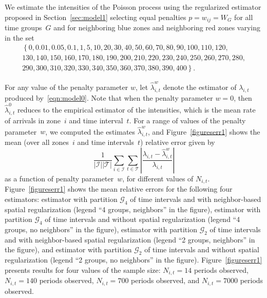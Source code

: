 \documentclass[article]{jss}
\begin{document}
{We estimate the intensities of the Poisson process using the regularized estimator proposed in Section~\ref{sec:model1} selecting equal penalties $p = w_{ij} = W_{G}$ for all time groups~$G$ and for neighboring blue zones and neighboring red zones varying in the set
$$
\begin{array}{l}
\left\{0,0.01,0.05,0.1,1,5,10,20,30,40,50,60,70,80,90,100,110,120,\right.\\
\left. 130,140,150,160,170, 180,190,200,210,220,230,240,250,260,270,280,\right.\\
\left. 290,300,310,320,330,340,350,360,370,380,390,400\right\}.
\end{array}
$$
}

For any value of the penalty parameter $w$, let $\hat{\lambda}^{w}_{i,t}$ denote the estimator of $\lambda_{i,t}$ produced by~\eqref{eqn:model0}.
Note that when the penalty parameter $w = 0$, then $\hat{\lambda}^{0}_{i,t}$ reduces to the empirical estimator of the intensities, which is the mean rate of arrivals in zone~$i$ and time interval~$t$.
For a range of values of the penalty parameter~$w$, we computed the estimates $\hat{\lambda}^{w}_{i,t}$, and Figure~\ref{figureserr1} shows the mean (over all zones~$i$ and time intervals~$t$) relative error given by
\fi
\[
\frac{1}{|\mathcal{I}||\mathcal{T}|} \sum_{i \in \mathcal{I}} \sum_{t \in \mathcal{T}}
\left|\frac{\lambda_{i,t} - \hat{\lambda}^{w}_{i,t}}{\lambda_{i,t}}\right|
\]
as a function of penalty parameter~$w$, for different values of $N_{i,t}$.
Figure~\ref{figureserr1} shows the mean relative errors for the following four estimators: estimator with partition $\mathcal{G}_{4}$ of time intervals and with neighbor-based spatial regularization (legend ``4 groups, neighbors'' in the figure), estimator with partition $\mathcal{G}_{4}$ of time intervals and without spatial regularization (legend ``4 groups, no neighbors'' in the figure), estimator with partition $\mathcal{G}_{2}$ of time intervals and with neighbor-based spatial regularization (legend ``2 groups, neighbors'' in the figure), and estimator with partition $\mathcal{G}_{2}$ of time intervals and without spatial regularization (legend ``2 groups, no neighbors'' in the figure).
Figure~\ref{figureserr1} presents results for four values of the sample size: $N_{i,t} = 14$ periods observed, $N_{i,t} = 140$ periods observed, $N_{i,t} = 700$ periods observed, and $N_{i,t} = 7000$ periods observed.
\end{document}
